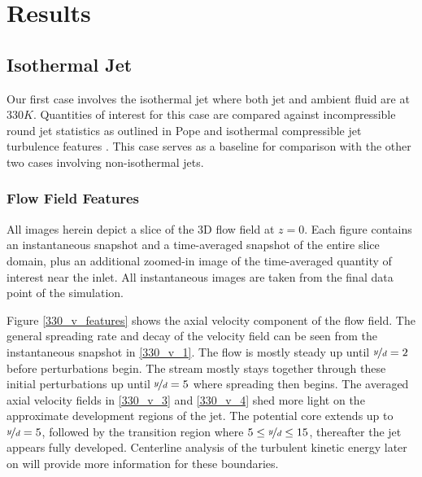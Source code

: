 \chapter{Results}

\section{Isothermal Jet}
Our first case involves the isothermal jet where both jet and ambient fluid are at $330 K$. Quantities of interest for this case are compared against incompressible round jet statistics as outlined in Pope \cite{Pope} and isothermal compressible jet turbulence features \cite{}. This case serves as a baseline for comparison with the other two cases involving non-isothermal jets. 
\subsection{Flow Field Features}
All images herein depict a slice of the 3D flow field at $z=0$. Each figure contains an instantaneous snapshot and a time-averaged snapshot of the entire slice domain, plus an additional zoomed-in image of the time-averaged quantity of interest near the inlet. All instantaneous images are taken from the final data point of the simulation.

Figure \ref{330_v_features} shows the axial velocity component of the flow field. The general spreading rate and decay of the velocity field can be seen from the instantaneous snapshot in \ref{330_v_1}. The flow is mostly steady up until $\nicefrac{y}{d}=2$ before perturbations begin. The stream mostly stays together through these initial perturbations up until $\nicefrac{y}{d}=5$ where spreading then begins. The averaged axial velocity fields in \ref{330_v_3} and \ref{330_v_4} shed more light on the approximate development regions of the jet. The potential core extends up to $\nicefrac{y}{d}=5$, followed by the transition region where $5 \leq \nicefrac{y}{d} \leq 15$, thereafter the jet appears fully developed. Centerline analysis of the turbulent kinetic energy later on will provide more information for these boundaries.  

